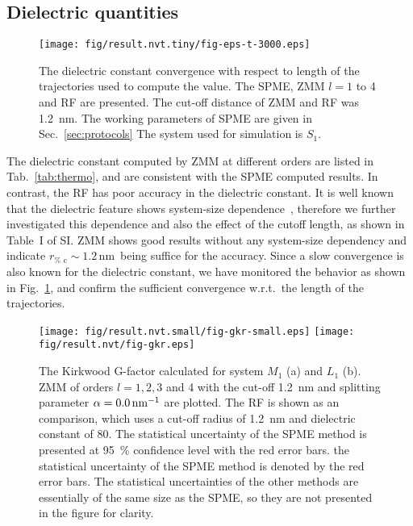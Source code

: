 \documentclass[a4paper,preprint,unsortedaddress,onecolumn,fleqn]{revtex4}
\begin{document}
\subsection{Dielectric quantities}

\begin{figure}[tbp]
\centering
\texttt{[image: fig/result.nvt.tiny/fig-eps-t-3000.eps]}
\caption{The dielectric constant convergence with respect to length of the
trajectories used to compute the value. The SPME, ZMM  $l=1$ to 4 and
RF are presented. The cut-off distance of ZMM and RF  was 1.2~nm. The
working parameters of SPME are given in Sec.~\protect\ref{sec:protocols} The
system used for simulation is $S_{1}$.}
\label{fig:eps-conv}
\end{figure}

The dielectric constant computed by ZMM  at different orders are listed
in Tab.~\ref{tab:thermo}, and are consistent with the SPME computed results.
In contrast, the RF  has poor accuracy in the dielectric constant. It
is well known that the dielectric feature shows system-size dependence~\cite%
{vanderSpoel2006origin}, therefore we further investigated this dependence
and also the effect of the cutoff length, as shown in Table~I of SI. ZMM
shows good results without any system-size dependency and indicate $r_{\text{%
c}}\sim 1.2\,$nm\ being suffice for the accuracy. Since a slow convergence
is also known for the dielectric constant, we have monitored the behavior as
shown in Fig.~\ref{fig:eps-conv}, and confirm the sufficient convergence
w.r.t.~the length of the trajectories.

\begin{figure}[tbp]
\centering
\texttt{[image: fig/result.nvt.small/fig-gkr-small.eps]}\newline
\texttt{[image: fig/result.nvt/fig-gkr.eps]}
\caption{The Kirkwood G-factor calculated for system $M_{1}$ (a) and $L_{1} $
(b). ZMM  of orders $l=1,2,3$ and 4 with the cut-off 1.2~nm and
splitting parameter $\protect\alpha =0.0\,\text{nm}^{-1}$ are plotted. The
RF  is shown as an comparison, which uses a cut-off radius of 1.2~nm
and dielectric constant of 80. The statistical uncertainty of the SPME
method is presented at 95~\% confidence level with the red error bars. the
statistical uncertainty of the SPME method is denoted by the red error bars.
The statistical uncertainties of the other methods are essentially of the
same size as the SPME, so they are not presented in the figure for clarity.}
\label{fig:gkr}
\end{figure}
\end{document}
